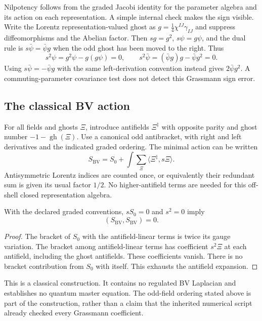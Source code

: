 Nilpotency follows from the graded Jacobi identity for the parameter algebra and its action on each representation. A simple internal check makes the sign visible. Write the Lorentz representation-valued ghost as $g=\tfrac14\chi^{IJ}\gamma_{IJ}$ and suppress diffeomorphisms and the Abelian factor. Then $sg=g^2$, $s\psi=g\psi$, and the dual rule is $s\bar\psi=\bar\psi g$ when the odd ghost has been moved to the right. Thus
\begin{equation}
 s^2\psi=g^2\psi-g(g\psi)=0,\qquad
 s^2\bar\psi=(\bar\psi g)g-\bar\psi g^2=0.
\end{equation}
Using $s\bar\psi=-\bar\psi g$ with the same left-derivation convention instead gives $2\bar\psi g^2$. A commuting-parameter covariance test does not detect this Grassmann sign error.

\subsection{The classical BV action}
For all fields and ghosts $\Xi$, introduce antifields $\Xi^\ddagger$ with opposite parity and ghost number $-1-\operatorname{gh}(\Xi)$. Use a canonical odd antibracket, with right and left derivatives and the indicated graded ordering. The minimal action can be written
\begin{equation}
 S_{\mathrm{BV}}=S_0+
     \int\sum_\Xi\langle\Xi^\ddagger,s\Xi\rangle.
 \label{c:constraints:bv-action}
\end{equation}
Antisymmetric Lorentz indices are counted once, or equivalently their redundant sum is given its usual factor $1/2$. No higher-antifield terms are needed for this off-shell closed representation algebra.

\begin{proposition}
With the declared graded conventions, $sS_0=0$ and $s^2=0$ imply
\begin{equation}
 (S_{\mathrm{BV}},S_{\mathrm{BV}})=0.
\end{equation}
\end{proposition}
\begin{proof}
The bracket of $S_0$ with the antifield-linear terms is twice its gauge variation. The bracket among antifield-linear terms has coefficient $s^2\Xi$ at each antifield, including the ghost antifields. These coefficients vanish. There is no bracket contribution from $S_0$ with itself. This exhausts the antifield expansion.
\end{proof}

This is a classical construction. It contains no regulated BV Laplacian and establishes no quantum master equation. The odd-field ordering stated above is part of the construction, rather than a claim that the inherited numerical script already checked every Grassmann coefficient.

